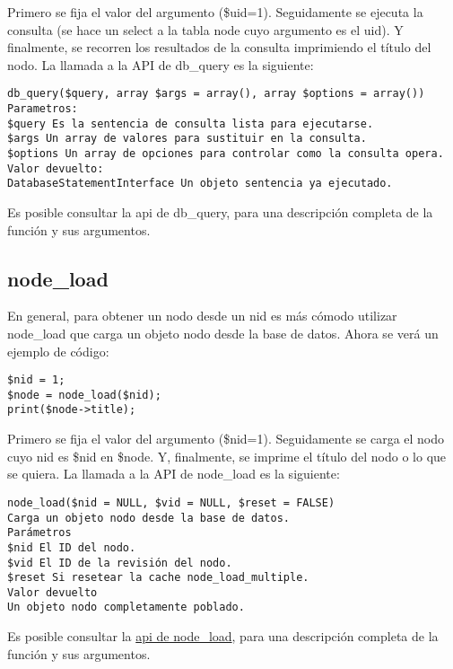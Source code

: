 \documentclass[11pt]{article}
\begin{document}
Primero se fija el valor del argumento (\$uid=1). Seguidamente se
ejecuta la consulta (se hace un select a la tabla node cuyo argumento
es el uid). Y finalmente, se recorren los resultados de la consulta
imprimiendo el título del nodo.  La llamada a la API de db\_query es la
siguiente:


\begin{verbatim}
db_query($query, array $args = array(), array $options = array())
Parametros:
$query Es la sentencia de consulta lista para ejecutarse. 
$args Un array de valores para sustituir en la consulta. 
$options Un array de opciones para controlar como la consulta opera.
Valor devuelto:
DatabaseStatementInterface Un objeto sentencia ya ejecutado.
\end{verbatim}



Es posible consultar la api de db\_query, para una descripción completa
de la función y sus argumentos.

\subsection{node\_load}
\label{sec-1.2}


En general, para obtener un nodo desde un nid es más cómodo utilizar
node\_load que carga un objeto nodo desde la base de datos. Ahora se
verá un ejemplo de código:


\begin{verbatim}
$nid = 1;
$node = node_load($nid);                                 
print($node->title);
\end{verbatim}



Primero se fija el valor del argumento (\$nid=1). Seguidamente se carga
el nodo cuyo nid es \$nid en \$node. Y, finalmente, se imprime el título
del nodo o lo que se quiera.  La llamada a la API de node\_load es la
siguiente:


\begin{verbatim}
node_load($nid = NULL, $vid = NULL, $reset = FALSE) 
Carga un objeto nodo desde la base de datos.
Parámetros
$nid El ID del nodo.
$vid El ID de la revisión del nodo.
$reset Si resetear la cache node_load_multiple.
Valor devuelto
Un objeto nodo completamente poblado.
\end{verbatim}



Es posible consultar la \href{http://api.drupal.org/api/drupal/modules--node--node.module/function/node_load/7}{api de node\_load}, para una descripción
completa de la función y sus argumentos.
\end{document}
